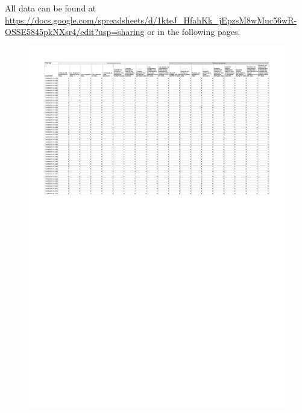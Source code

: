 All data can be found at \url{https://docs.google.com/spreadsheets/d/1kteJ_HfahKk_jEpzsM8wMuc56wR-OSSE5845pkNXsr4/edit?usp=sharing} or in the following pages.

\begin{figure}[H]
  \centering
    \includegraphics{sections/appendicies/data3.pdf}
    \caption*{}
\end{figure}

